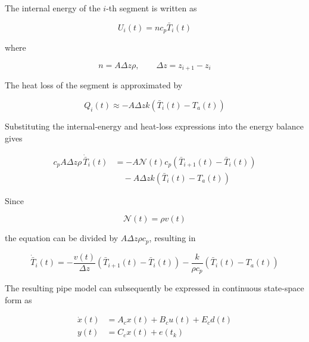 The internal energy of the \(i\)-th segment is written as

\begin{equation}
    U_i(t)
    =
    n c_p \bar{T}_i(t)
\end{equation}

where

\begin{equation}
    n
    =
    A\Delta z \rho,
    \qquad
    \Delta z
    =
    z_{i+1}-z_i
\end{equation}

The heat loss of the segment is approximated by

\begin{equation}
    Q_i(t)
    \approx
    -
    A\Delta z k
    \left(
        \bar{T}_i(t)-T_a(t)
    \right)
\end{equation}

Substituting the internal-energy and heat-loss expressions into the energy
balance gives

\begin{align}
    c_p A\Delta z \rho \,
    \dot{\bar{T}}_i(t)
    &=
    -
    A\mathcal{N}(t)c_p
    \left(
        \bar{T}_{i+1}(t)
        -
        \bar{T}_i(t)
    \right)
    \nonumber\\
    &\quad
    -
    A\Delta z k
    \left(
        \bar{T}_i(t)-T_a(t)
    \right)
\end{align}

Since

\begin{equation}
    \mathcal{N}(t)
    =
    \rho v(t)
\end{equation}

the equation can be divided by \(A\Delta z\rho c_p\), resulting in

\begin{equation}
    \boxed{
    \dot{\bar{T}}_i(t)
    =
    -
    \frac{v(t)}{\Delta z}
    \left(
        \bar{T}_{i+1}(t)
        -
        \bar{T}_i(t)
    \right)
    -
    \frac{k}{\rho c_p}
    \left(
        \bar{T}_i(t)
        -
        T_a(t)
    \right)
    }
    \label{eq:district_heating_temperature}
\end{equation}

The resulting pipe model can subsequently be expressed in continuous
state-space form as

\begin{align}
    \dot{x}(t)
    &=
    A_c x(t)
    +
    B_c u(t)
    +
    E_c d(t)\\
    y(t)
    &=
    C_c x(t)
    +
    e(t_k)
\end{align}

